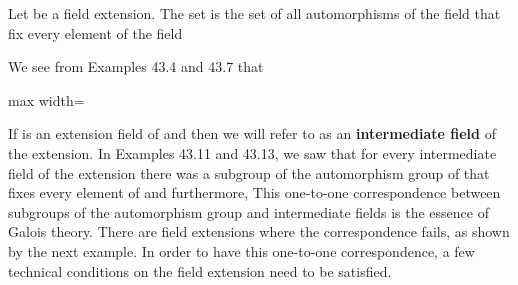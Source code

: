 \documentclass[11pt,oneside]{article}
\begin{document}
\begin{BookBody}

 Let  be a field extension. The set  is the set of all automorphisms of the field  that fix every element of the field \BookEnd{\blacksquare}

 We see from Examples 43.4 and 43.7 that

\begin{center}\begin{adjustbox}{max width=\linewidth}\end{adjustbox}\end{center} \BookEnd{\blacktriangle}

If  is an extension field of  and  then we will refer to  as an\textbf{ in}\textbf{termediate field} of the extension. In Examples 43.11 and 43.13, we saw that for every intermediate field  of the extension  there was a subgroup  of the automorphism group of  that fixes every element of  and furthermore,  This one-to-one correspondence between subgroups of the automorphism group and intermediate fields is the essence of Galois theory. There are field extensions where the correspondence fails, as shown by the next example. In order to have this one-to-one correspondence, a few technical conditions on the field extension need to be satisfied.


\end{BookBody}
\end{document}
